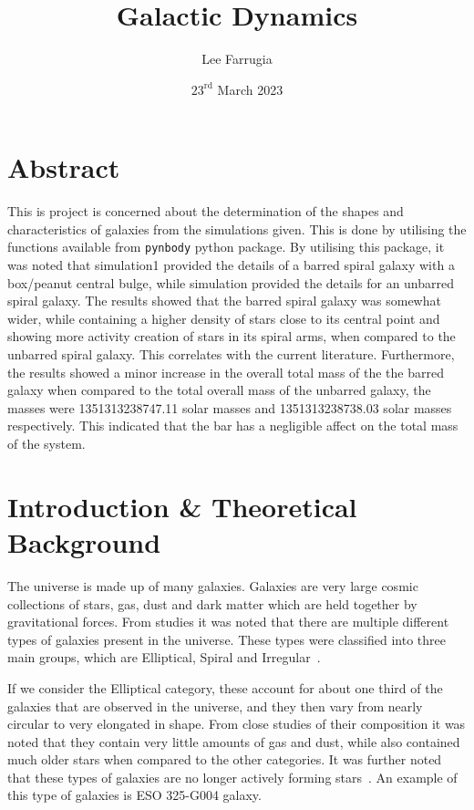 \documentclass[12pt, a4paper]{article}
\title{Galactic Dynamics}
\date{\(23^\mathrm{{rd}}\) March 2023}
\author{Lee Farrugia}
\begin{document}
\maketitle
\thispagestyle{titlepagestyle}
\pagestyle{mystyle}

\section*{Abstract}
This is project is concerned about the determination of the shapes and characteristics of galaxies from the simulations given. This is done by utilising the functions available from \lstinline[language=iPython]{pynbody} python package. By utilising this package, it was noted that simulation1 provided the details of a barred spiral galaxy with a box/peanut central bulge, while simulation provided the details for an unbarred spiral galaxy. The results showed that the barred spiral galaxy was somewhat wider, while containing a higher density of stars close to its central point and showing more activity creation of stars in its spiral arms, when compared to the unbarred spiral galaxy. This correlates with the current literature. Furthermore, the results showed a minor increase in the overall total mass of the the barred galaxy when compared to the total  overall mass of the unbarred galaxy, the masses were 1351313238747.11 solar masses and 1351313238738.03 solar masses respectively. This indicated that the bar has a negligible affect on the total mass of the system. 

\section{Introduction \& Theoretical Background}
The universe is made up of many galaxies. Galaxies are very large cosmic collections of stars, gas, dust and dark matter which are held together by gravitational forces. From studies it was noted that there are multiple different types of galaxies present in the universe. These types were classified into three main groups, which are Elliptical, Spiral and Irregular~\parencite{GALAXIES2023}.

If we consider the Elliptical category, these account for about one third of the galaxies that are observed in the universe, and they then vary from nearly circular to very elongated in shape. From close studies of their composition it was noted that they contain very little amounts of gas and dust, while also contained much older stars when compared to the other categories. It was further noted that these types of galaxies are no longer actively forming stars~\parencite{GALAXIES2023}. An example of this type of galaxies is ESO 325-G004 galaxy.
\end{document}
